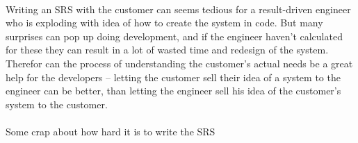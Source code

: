 \\
Writing an SRS with the customer can seems tedious for a result-driven engineer who is exploding with idea of how to create the system in code.
But many surprises can pop up doing development, and if the engineer haven't calculated for these they can result in a lot of wasted time and redesign of the system.
Therefor can the process of understanding the customer's actual needs be a great help for the developers -- letting the customer sell their idea of a system to the engineer can be better, than letting the engineer sell his idea of the customer's system to the customer.
\\
\\
Some crap about how hard it is to write the SRS






